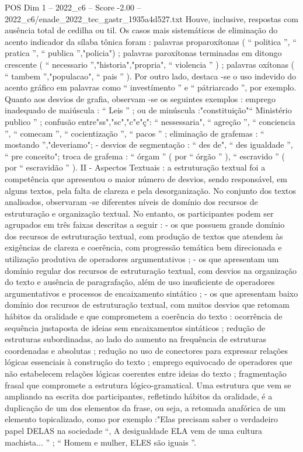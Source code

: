 \begin{textsample}{POS Dim 1 – 2022\_c6 – Score -2.00 – 2022\_c6/enade\_2022\_tec\_gastr\_1935a4d527.txt}
Houve, inclusive, respostas com ausência total de cedilha ou til.
Os casos mais sistemáticos de eliminação do acento indicador da sílaba tônica foram : palavras proparoxítonas ( “ politica ”, “ pratica ”, “ publica ”,"policia") ; palavras paroxítonas terminadas em ditongo crescente ( “ necessario ”,"historia","propria", “ violencia ” ) ; palavras oxítonas ( “ tambem ”,"populacao", “ pais ” ).
Por outro lado, destaca -se o uso indevido do acento gráfico em palavras como “ investímento ” e “ pátriarcado ”, por exemplo.
Quanto aos desvios de grafia, observam -se os seguintes exemplos : emprego inadequado de maiúscula : “ Leis ” ; ou de minúscula :"constituição"“ Ministério publico ” ; confusão entre"ss","sc","c"e"ç": “ nessessaria", “ agreção ”, “ conciencia ”, “ comecam ”, “ cocientização ”, “ pacos ” ; eliminação de grafemas : “ mostando ”,"deveriamo"; - desvios de segmentação : “ des de", “ des igualdade ”, “ pre conceito"; troca de grafema : “ órgam ” ( por “ órgão ” ), “ escravido ” ( por “ escravidão ” ).
II - Aspectos Textuais : a estruturação textual foi a competência que apresentou o maior número de desvios, sendo responsável, em alguns textos, pela falta de clareza e pela desorganização.
No conjunto dos textos analisados, observaram -se diferentes níveis de domínio dos recursos de estruturação e organização textual.
No entanto, os participantes podem ser agrupados em três faixas descritas a seguir : - os que possuem grande domínio dos recursos de estruturação textual, com produção de textos que atendem às exigências de clareza e coerência, com progressão temática bem direcionada e utilização produtiva de operadores argumentativos ; - os que apresentam um domínio regular dos recursos de estruturação textual, com desvios na organização do texto e ausência de paragrafação, além de uso insuficiente de operadores argumentativos e processos de encaixamento sintático ; - os que apresentam baixo domínio dos recursos de estruturação textual, com muitos desvios que retomam hábitos da oralidade e que comprometem a coerência do texto : ocorrência de sequência justaposta de ideias sem encaixamentos sintáticos ; redução de estruturas subordinadas, ao lado do aumento na frequência de estruturas coordenadas e absolutas ; redução no uso de conectores para expressar relações lógicas essenciais à construção do texto ; emprego equivocado de operadores que não estabelecem relações lógicas coerentes entre ideias do texto ; fragmentação frasal que compromete a estrutura lógico-gramatical.
Uma estrutura que vem se ampliando na escrita dos participantes, refletindo hábitos da oralidade, é a duplicação de um dos elementos da frase, ou seja, a retomada anafórica de um elemento topicalizado, como por exemplo :"Elas precisam saber o verdadeiro papel DELAS na sociedade “, A desigualdade ELA vem de uma cultura machista... ” ; “ Homem e mulher, ELES são iguais ”.

\end{textsample}
